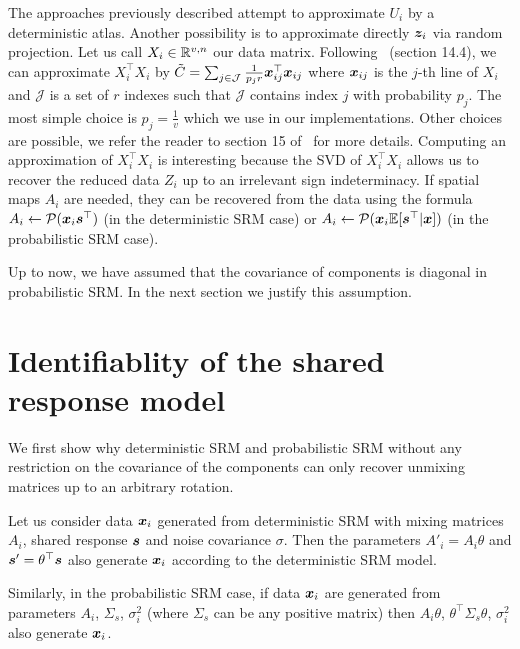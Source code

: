 The approaches previously described attempt to approximate $U_i$ by a
deterministic atlas. Another possibility is to approximate directly $\boldsymbol{z}_i$ via
random projection.
Let us call $X_i \in \mathbb{R}^{v,
  n}$ our data matrix. Following~\cite{mahoney2016lecture} (section 14.4), we
can approximate $X_i^{\top} X_i$ by $\tilde{C} = \sum_{j \in \mathcal{J}} \frac1{p_j r} \boldsymbol{x}_{ij}^{\top} \boldsymbol{x}_{ij}$ where $\boldsymbol{x}_{ij}$ is the $j$-th line of
  $X_i$ and $\mathcal{J}$ is a set of $r$ indexes such that $\mathcal{J}$ contains
  index $j$ with probability $p_j$. The most simple choice is $p_j=\frac1{v}$
  which we use in our implementations. Other choices are possible, we refer the reader to section 15
  of~\cite{mahoney2016lecture} for more details.  Computing an approximation of $X_i^{\top} X_i$ is interesting
  because the SVD of $X_i^{\top} X_i$ allows us to recover the reduced data
  $Z_i$ up to an irrelevant sign indeterminacy. 
  If spatial maps $A_i$ are needed, they can be recovered from the data using the formula
  $A_i \leftarrow \mathcal{P}(\boldsymbol{x}_i \boldsymbol{s}^{\top})$ (in the deterministic SRM case) or
  $A_i \leftarrow \mathcal{P}(\boldsymbol{x}_i \mathbb{E}[\boldsymbol{s}^{\top}|\boldsymbol{x}])$ (in the probabilistic SRM case).

  Up to now, we have assumed that the covariance of components is diagonal in
  probabilistic SRM. In the next section we justify this assumption.

\section{Identifiablity of the shared response model}
We first show why deterministic SRM and probabilistic SRM without any
restriction on the covariance of the components can
only recover unmixing matrices up to an arbitrary rotation.

Let us consider data $\boldsymbol{x}_i$ generated from deterministic SRM with
mixing matrices $A_i$, shared response $\boldsymbol{s}$ and noise covariance $\sigma$.
Then the parameters $A'_i = A_i \theta$ and $\boldsymbol{s}' = \theta^{\top} \boldsymbol{s}$ also
generate $\boldsymbol{x}_i$ according to the deterministic SRM model.

Similarly, in the probabilistic SRM case, if data $\boldsymbol{x}_i$ are generated from
parameters $A_i$, $\Sigma_s$, $\sigma_i^2$ (where $\Sigma_s$ can be any positive
matrix) then $A_i\theta$, $\theta^{\top}
\Sigma_s \theta$, $\sigma_i^2$ also generate $\boldsymbol{x}_i$.

